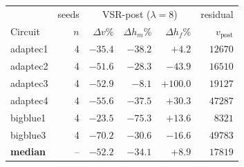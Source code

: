 \begin{tabular}{lr|rrr|r}
\toprule
& seeds & \multicolumn{3}{c|}{VSR-post ($\lambda{=}8$)} & residual \\
Circuit & $n$ & $\Delta v$\% & $\Delta h_m$\% & $\Delta h_f$\% & $v_\text{post}$ \\
\midrule
adaptec1 & 4 & $-35.4$ & $-38.2$ & $+4.2$ & $12670$ \\
adaptec2 & 4 & $-51.6$ & $-28.3$ & $-43.9$ & $16510$ \\
adaptec3 & 4 & $-52.9$ & $-8.1$ & $+100.0$ & $19127$ \\
adaptec4 & 4 & $-55.6$ & $-37.5$ & $+30.3$ & $47287$ \\
bigblue1 & 4 & $-23.5$ & $-75.3$ & $+13.6$ & $8321$ \\
bigblue3 & 4 & $-70.2$ & $-30.6$ & $-16.6$ & $49783$ \\
\midrule
\textbf{median} & -- & $-52.2$ & $-34.1$ & $+8.9$ & $17819$ \\
\bottomrule
\end{tabular}
